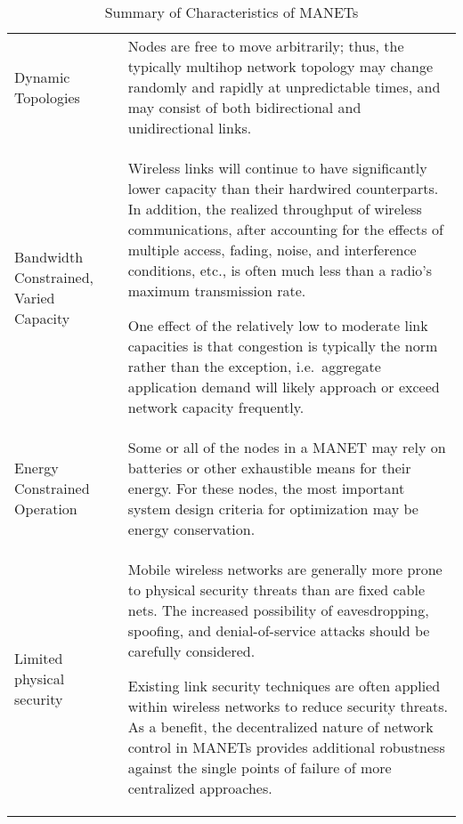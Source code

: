 \begin{table}
  \begin{tabularx}{\textwidth}{p{2cm}X}\toprule
    Dynamic Topologies & Nodes are free to move arbitrarily; thus, the typically multihop network topology may change randomly and rapidly at unpredictable times, and may consist of both bidirectional and unidirectional links. \\
    Bandwidth Constrained, Varied Capacity & Wireless links will continue to have significantly lower capacity than their hardwired counterparts. In addition, the realized throughput of wireless communications, after accounting for the effects of multiple access, fading, noise, and interference conditions, etc., is often much less than a radio's maximum transmission rate. \par
One effect of the relatively low to moderate link capacities is that congestion is typically the norm rather than the exception, i.e.\  aggregate application demand will likely approach or exceed network capacity frequently.\\
    Energy Constrained Operation &  Some or all of the nodes in a MANET may rely on batteries or other exhaustible means for their energy. For these nodes, the most important system design criteria for optimization may be energy conservation.\\
    Limited physical security & Mobile wireless networks are generally more prone to physical security threats than are fixed cable nets.  The increased possibility of eavesdropping, spoofing, and denial-of-service attacks should be carefully considered.\par
Existing link security techniques are often applied within wireless networks to reduce security threats. 
As a benefit, the decentralized nature of network control in MANETs provides additional robustness against the single points of failure of more centralized approaches.\\

\end{tabularx}
\caption{Summary of Characteristics of MANETs\cite{Corson1999}}
\label{tab:manet_characteristics}
\end{table}






\ifx\ifthesis\undefined
	
\fi
